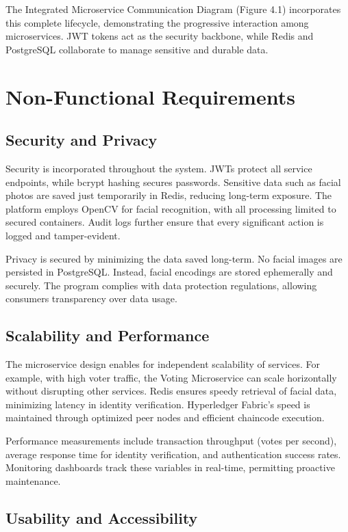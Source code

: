 \documentclass[a4paper,10pt]{report}
\begin{document}
The Integrated Microservice Communication Diagram (Figure 4.1) incorporates this complete lifecycle, demonstrating the progressive interaction among microservices.  JWT tokens act as the security backbone, while Redis and PostgreSQL collaborate to manage sensitive and durable data.

\section{Non-Functional Requirements}

\subsection{Security and Privacy}

Security is incorporated throughout the system.  JWTs protect all service endpoints, while bcrypt hashing secures passwords.  Sensitive data such as facial photos are saved just temporarily in Redis, reducing long-term exposure.  The platform employs OpenCV for facial recognition, with all processing limited to secured containers.  Audit logs further ensure that every significant action is logged and tamper-evident.

Privacy is secured by minimizing the data saved long-term.  No facial images are persisted in PostgreSQL.  Instead, facial encodings are stored ephemerally and securely.  The program complies with data protection regulations, allowing consumers transparency over data usage.

\subsection{Scalability and Performance}

The microservice design enables for independent scalability of services.  For example, with high voter traffic, the Voting Microservice can scale horizontally without disrupting other services.  Redis ensures speedy retrieval of facial data, minimizing latency in identity verification.  Hyperledger Fabric’s speed is maintained through optimized peer nodes and efficient chaincode execution.

Performance measurements include transaction throughput (votes per second), average response time for identity verification, and authentication success rates.  Monitoring dashboards track these variables in real-time, permitting proactive maintenance.

\subsection{Usability and Accessibility}
\end{document}
